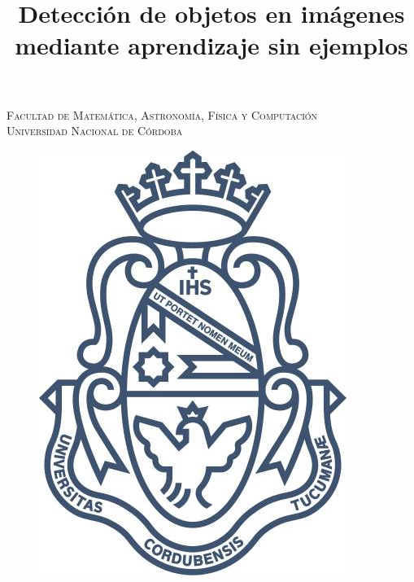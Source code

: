 \documentclass[12pt,twosided]{book}
\begin{document}
\newcommand{\etal}{\textit{et al}.}
\newcommand{\todos}[1]{{\color{red}[TODO: #1]}}
\renewcommand{\listtablename}{Índice de tablas}
\renewcommand{\tablename}{Tabla}

\title{Detección de objetos en imágenes mediante aprendizaje sin ejemplos} %

\begin{titlepage}
\begin{center}

\textsc{\Large Facultad de Matemática, Astronomía, Física y Computación}\\[2em]

\textsc{Universidad Nacional de Córdoba}

\begin{figure}[h]
\begin{center}
\includegraphics[scale=0.2]{img/unc.jpg}
\end{center}
\end{figure}


\end{center}
\end{titlepage}
\end{document}
